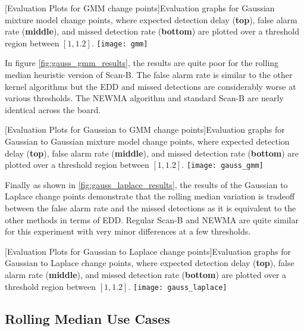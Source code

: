 \begin{center} 
[Evaluation Plots for GMM change points]{Evaluation graphs for Gaussian mixture model change points, where expected detection delay (\textbf{top}), false alarm rate (\textbf{middle}), and missed detection rate (\textbf{bottom}) are plotted over a threshold region between $[1,1.2]$. } 
\texttt{[image: gmm]} 
\label{fig:gmm_results} 
\end{center}

In figure \ref{fig:gauss_gmm_results}, the results are quite poor for the rolling median heuristic version of Scan-B. The false alarm rate is similar to the other kernel algorithms but the EDD and missed detections are considerably worse at various thresholds. The NEWMA algorithm and standard Scan-B are nearly identical across the board.
\begin{center} 
[Evaluation Plots for Gaussian to GMM change points]{Evaluation graphs for Gaussian to Gaussian mixture model change points, where expected detection delay (\textbf{top}), false alarm rate (\textbf{middle}), and missed detection rate (\textbf{bottom}) are plotted over a threshold region between $[1,1.2]$. } 
\texttt{[image: gauss\_gmm]} 
\label{fig:gauss_gmm_results} 
\end{center}

Finally as shown in \ref{fig:gauss_laplace_results}, the results of the Gaussian to Laplace change points demonstrate that the rolling median variation is tradeoff between the false alarm rate and the missed detections as it is equivalent to the other methods in terms of EDD. Regular Scan-B and NEWMA are quite similar for this experiment with very minor differences at a few thresholds. 
\begin{center} 
[Evaluation Plots for Gaussian to Laplace change points]{Evaluation graphs for Gaussian to Laplace change points, where expected detection delay (\textbf{top}), false alarm rate (\textbf{middle}), and missed detection rate (\textbf{bottom}) are plotted over a threshold region between $[1,1.2]$. } 
\texttt{[image: gauss\_laplace]} 
\label{fig:gauss_laplace_results} 
\end{center}

\subsection{Rolling Median Use Cases}